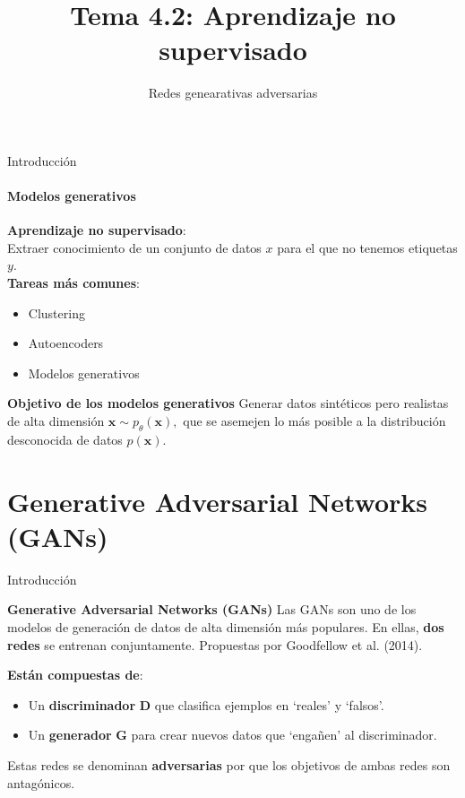 \documentclass[aspectratio=169]{beamer}
\title{Tema 4.2: Aprendizaje no supervisado}
\subtitle{Redes genearativas adversarias}
\begin{document}
\begin{frame}[plain]
	\titlepage 
\end{frame}

\logo{}

\begin{frame}[t]{Introducción}
	\framesubtitle{Modelos generativos}
	\textbf{Aprendizaje no supervisado}:\\
	Extraer conocimiento de un conjunto de datos $x$ para el que no tenemos etiquetas $y$.\\
	\vspace{.4cm}
	\textbf{Tareas más comunes}:
	\begin{itemize}
		\item Clustering
		\item Autoencoders
		\item Modelos generativos
	\end{itemize}
	\vspace{.4cm}
	\begin{block}{\textbf{Objetivo de los modelos generativos}}
		Generar datos sintéticos pero realistas de alta dimensión $\mathbf{x} \sim p_{\theta}(\mathbf{x}),$ que se asemejen lo más posible a la distribución desconocida de datos $p(\mathbf{x})$.
	\end{block}

\end{frame}

\section{Generative Adversarial Networks (GANs)}

\begin{frame}[t]{Introducción}
	\begin{block}{\textbf{Generative Adversarial Networks (GANs)}}
		Las GANs son uno de los modelos de generación de datos de alta dimensión más populares. En ellas, \textbf{dos redes} se entrenan conjuntamente. Propuestas por Goodfellow et al. (2014).
	\end{block}
	\vspace{.5cm}
	\textbf{Están compuestas de}:
	\begin{itemize}
		\item Un \textbf{discriminador} $\textbf{D}$ que clasifica ejemplos en `reales' y `falsos'.
		\item Un \textbf{generador} $\textbf{G}$ para crear nuevos datos que `engañen' al discriminador.
	\end{itemize}
	\vspace{.5cm}
	\begin{block}{}
		Estas redes se denominan \textbf{adversarias} por que los objetivos de ambas redes son antagónicos.
	\end{block}
\end{frame}
\end{document}
